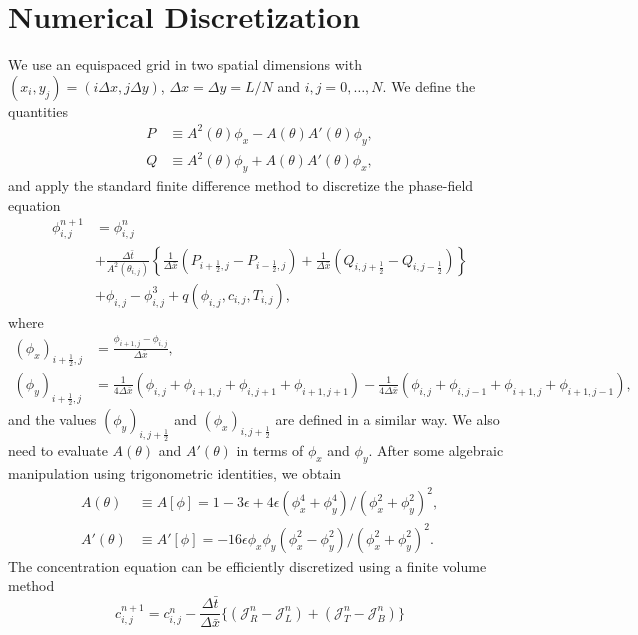 \documentclass[a4paper,12pt]{article}
\newcommand{\op}[1]{\mathcal{#1}}
\begin{document}
\section{Numerical Discretization}
We use an equispaced grid in two spatial dimensions with $(x_i, y_j) = ( i \Delta x, j \Delta y)$, $\Delta x = \Delta y = L/N$ and $i,j = 0, \dots, N$. We define the quantities
\begin{align}
P & \equiv A^2(\theta)\phi_x - A(\theta) A'(\theta) \phi_y, \\ 
Q & \equiv A^2(\theta)\phi_y + A(\theta) A'(\theta) \phi_x,
\end{align}
and apply the standard finite difference method to discretize the phase-field equation
\begin{align}
\phi^{n+1}_{i,j} & = \phi^n_{i,j} \nonumber  \\ 
& + \frac{\Delta \bar{t}}{A^2(\theta_{i,j})}  \left\{ 
 \frac{1}{\Delta \bar{x}} \left(P_{i+\frac{1}{2},j} - P_{i-\frac{1}{2},j} \right) +   
  \frac{1}{\Delta \bar{x}} \left(Q_{i, j+ \frac{1}{2}} - Q_{i, j-\frac{1}{2}} \right)  \right\} \\
& + \phi_{i,j} - \phi_{i,j}^3  + q(\phi_{i,j}, c_{i,j}, T_{i,j}) \nonumber,
\end{align}
where
\begin{align}
(\phi_x)_{i+\frac{1}{2},j} &= \frac{\phi_{i+1,j} - \phi_{i,j}}{\Delta \bar{x}}, \\
(\phi_y)_{i+\frac{1}{2},j} &= \frac{1}{4\Delta \bar{x}} (\phi_{i,j}+\phi_{i+1,j}+\phi_{i,j+1}+\phi_{i+1,j+1}) - \frac{1}{4\Delta \bar{x}} (\phi_{i,j}+\phi_{i,j-1}+\phi_{i+1,j}+\phi_{i+1,j-1}),
\end{align}
and the values $(\phi_y)_{i,j+\frac{1}{2}}$ and $(\phi_x)_{i,j+\frac{1}{2}}$ are defined in a similar way.  We also need to evaluate $A(\theta)$ and $A'(\theta)$  in terms of $\phi_x$ and $\phi_y$. After some algebraic manipulation using trigonometric identities, we obtain
\begin{align}
A(\theta) & \equiv A[\phi] = 1 - 3\epsilon + 4 \epsilon \left(  \phi_x^4 + \phi_y^4  \right) / (\phi_x^2 + \phi_y^2)^2, \\
A'(\theta) & \equiv A'[\phi]= -16 \epsilon \phi_x \phi_y (\phi_x^2 - \phi_y^2) / (\phi_x^2 + \phi_y^2)^2.
\end{align}
The concentration equation can be efficiently discretized using a finite volume method
\begin{equation}
c^{n+1}_{i,j} = c^n_{i,j} - \frac{\Delta \bar{t}}{\Delta \bar{x}} \{ (\op{J}_R^n - \op{J}_L^n) + (\op{J}_T^n - \op{J}_B^n)\}
\end{equation}
\end{document}
